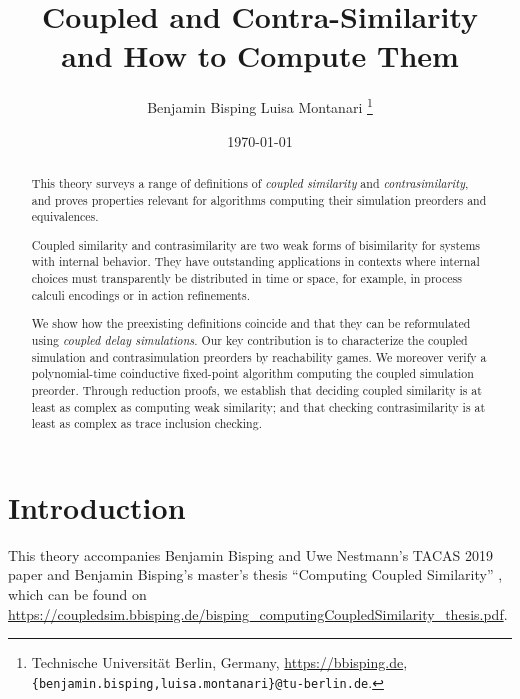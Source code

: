 \documentclass[10pt,a4paper]{article}
\title{ \textbf{Coupled and Contra-Similarity} \\ \Large and How to Compute Them }
\author{ Benjamin Bisping \qquad Luisa Montanari%
  \footnote{Technische Universit\"at Berlin, Germany,
    \url{https://bbisping.de}, \texttt{\{benjamin.bisping,luisa.montanari\}@tu-berlin.de}.} }
\date{\today}
\begin{document}
\maketitle

\begin{abstract}
\noindent
This theory surveys a range of definitions of \emph{coupled similarity} and \emph{contrasimilarity},
and proves properties relevant for algorithms computing their simulation preorders and equivalences.

Coupled similarity and contrasimilarity are two weak forms of bisimilarity for systems with
internal behavior.
They have outstanding applications in contexts where internal choices must transparently be
distributed in time or space, for example, in process calculi encodings or in action refinements.

We show how the preexisting definitions coincide and that they can be reformulated using
\emph{coupled delay simulations}. Our key contribution is to characterize the
coupled simulation and contrasimulation preorders by reachability games. We moreover verify a
polynomial-time coinductive fixed-point algorithm computing the coupled simulation preorder.
Through reduction proofs, we establish that deciding coupled similarity is at least as complex
as computing weak similarity; and that checking contrasimilarity is at least as complex as trace inclusion
checking.
\end{abstract}

\tableofcontents

\section{Introduction}

\cite{bm2021contrasimilarity}

This theory accompanies Benjamin Bisping and Uwe Nestmann's TACAS 2019 paper \cite{bn2019coupledsimTacas}
and Benjamin Bisping's master's thesis ``Computing Coupled Similarity'' \cite{bisping2018coupledsim},
which can be found on \url{https://coupledsim.bbisping.de/bisping_computingCoupledSimilarity_thesis.pdf}.





{}


\end{document}
